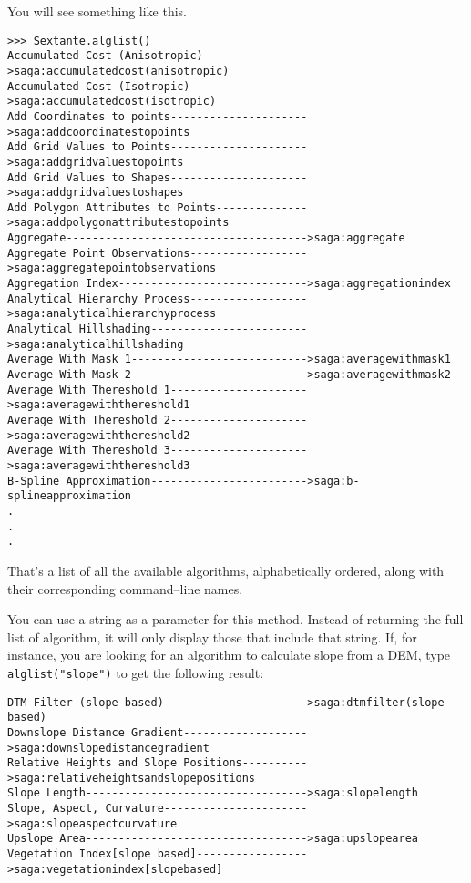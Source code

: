 You will see something like this. 

\begin{verbatim}
>>> Sextante.alglist()
Accumulated Cost (Anisotropic)---------------->saga:accumulatedcost(anisotropic)
Accumulated Cost (Isotropic)------------------>saga:accumulatedcost(isotropic)
Add Coordinates to points--------------------->saga:addcoordinatestopoints
Add Grid Values to Points--------------------->saga:addgridvaluestopoints
Add Grid Values to Shapes--------------------->saga:addgridvaluestoshapes
Add Polygon Attributes to Points-------------->saga:addpolygonattributestopoints
Aggregate------------------------------------->saga:aggregate
Aggregate Point Observations------------------>saga:aggregatepointobservations
Aggregation Index----------------------------->saga:aggregationindex
Analytical Hierarchy Process------------------>saga:analyticalhierarchyprocess
Analytical Hillshading------------------------>saga:analyticalhillshading
Average With Mask 1--------------------------->saga:averagewithmask1
Average With Mask 2--------------------------->saga:averagewithmask2
Average With Thereshold 1--------------------->saga:averagewiththereshold1
Average With Thereshold 2--------------------->saga:averagewiththereshold2
Average With Thereshold 3--------------------->saga:averagewiththereshold3
B-Spline Approximation------------------------>saga:b-splineapproximation
.
.
.
\end{verbatim}

That's a list of all the available algorithms, alphabetically ordered, along with their corresponding command--line names.

You can use a string as a parameter for this method. Instead of returning the full list of algorithm, it will only display those that include that string. If, for instance, you are looking for an algorithm to calculate slope from a DEM, type \texttt{alglist("slope")} to get the following result:

\begin{verbatim}
DTM Filter (slope-based)---------------------->saga:dtmfilter(slope-based)
Downslope Distance Gradient------------------->saga:downslopedistancegradient
Relative Heights and Slope Positions---------->saga:relativeheightsandslopepositions
Slope Length---------------------------------->saga:slopelength
Slope, Aspect, Curvature---------------------->saga:slopeaspectcurvature
Upslope Area---------------------------------->saga:upslopearea
Vegetation Index[slope based]----------------->saga:vegetationindex[slopebased]
\end{verbatim}

